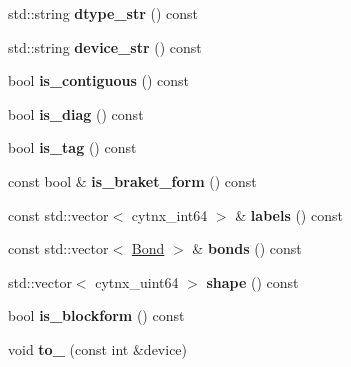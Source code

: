 \begin{DoxyCompactItemize}
std\+::string {\bfseries dtype\+\_\+str} () const
\item 
\mbox{\label{classcytnx_1_1UniTensor_ae7862c67c8ce93035aa7c6ffb3fc0f17}} 
std\+::string {\bfseries device\+\_\+str} () const
\item 
\mbox{\label{classcytnx_1_1UniTensor_a0b2eb7bd2d16f74c43f991c2f3a64fac}} 
bool {\bfseries is\+\_\+contiguous} () const
\item 
\mbox{\label{classcytnx_1_1UniTensor_a8de198d36f24c6e9d49b357632ec0c98}} 
bool {\bfseries is\+\_\+diag} () const
\item 
\mbox{\label{classcytnx_1_1UniTensor_a1c3cbcbe162042897fe77c9ce7632af2}} 
bool {\bfseries is\+\_\+tag} () const
\item 
\mbox{\label{classcytnx_1_1UniTensor_ac7cce8eac4dc054af70723faa9d3bcf0}} 
const bool \& {\bfseries is\+\_\+braket\+\_\+form} () const
\item 
\mbox{\label{classcytnx_1_1UniTensor_a38073b2e56a0902146951155841c85bf}} 
const std\+::vector$<$ cytnx\+\_\+int64 $>$ \& {\bfseries labels} () const
\item 
\mbox{\label{classcytnx_1_1UniTensor_abc8348e0f56e2479dbe45273c3055b1b}} 
const std\+::vector$<$ \hyperlink{classcytnx_1_1Bond}{Bond} $>$ \& {\bfseries bonds} () const
\item 
\mbox{\label{classcytnx_1_1UniTensor_a38e60453fd51add542acdc43c8558f24}} 
std\+::vector$<$ cytnx\+\_\+uint64 $>$ {\bfseries shape} () const
\item 
\mbox{\label{classcytnx_1_1UniTensor_aac44ae40cb93f11f673ac0c1930ae319}} 
bool {\bfseries is\+\_\+blockform} () const
\item 
\mbox{\label{classcytnx_1_1UniTensor_a9aa08f2c848cc7d31bceac7656b4a976}} 
void {\bfseries to\+\_\+} (const int \&device)
\item 
\mbox{\label{classcytnx_1_1UniTensor_a025f4a2d775a9892b7f86aeff364fa49}} 

\end{DoxyCompactItemize}
